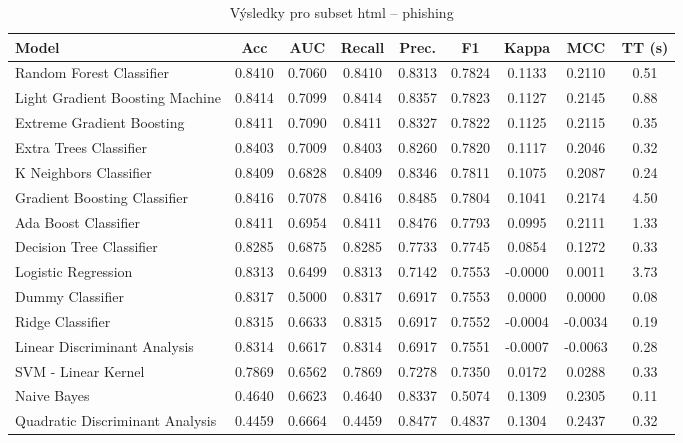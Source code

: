 \begin{table}[H]
  \centering
  \small
  \caption{Výsledky pro subset html – phishing}
  \begin{tabular}{|l|c|c|c|c|c|c|c|c|}
    \hline
    \textbf{Model} & \textbf{Acc} & \textbf{AUC} & \textbf{Recall} & \textbf{Prec.} & \textbf{F1} & \textbf{Kappa} & \textbf{MCC} & \textbf{TT (s)} \\
    \hline
    Random Forest Classifier & 0.8410 & 0.7060 & 0.8410 & 0.8313 & 0.7824 & 0.1133 & 0.2110 & 0.51 \\
    Light Gradient Boosting Machine & 0.8414 & 0.7099 & 0.8414 & 0.8357 & 0.7823 & 0.1127 & 0.2145 & 0.88 \\
    Extreme Gradient Boosting & 0.8411 & 0.7090 & 0.8411 & 0.8327 & 0.7822 & 0.1125 & 0.2115 & 0.35 \\
    Extra Trees Classifier & 0.8403 & 0.7009 & 0.8403 & 0.8260 & 0.7820 & 0.1117 & 0.2046 & 0.32 \\
    K Neighbors Classifier & 0.8409 & 0.6828 & 0.8409 & 0.8346 & 0.7811 & 0.1075 & 0.2087 & 0.24 \\
    Gradient Boosting Classifier & 0.8416 & 0.7078 & 0.8416 & 0.8485 & 0.7804 & 0.1041 & 0.2174 & 4.50 \\
    Ada Boost Classifier & 0.8411 & 0.6954 & 0.8411 & 0.8476 & 0.7793 & 0.0995 & 0.2111 & 1.33 \\
    Decision Tree Classifier & 0.8285 & 0.6875 & 0.8285 & 0.7733 & 0.7745 & 0.0854 & 0.1272 & 0.33 \\
    Logistic Regression & 0.8313 & 0.6499 & 0.8313 & 0.7142 & 0.7553 & -0.0000 & 0.0011 & 3.73 \\
    Dummy Classifier & 0.8317 & 0.5000 & 0.8317 & 0.6917 & 0.7553 & 0.0000 & 0.0000 & 0.08 \\
    Ridge Classifier & 0.8315 & 0.6633 & 0.8315 & 0.6917 & 0.7552 & -0.0004 & -0.0034 & 0.19 \\
    Linear Discriminant Analysis & 0.8314 & 0.6617 & 0.8314 & 0.6917 & 0.7551 & -0.0007 & -0.0063 & 0.28 \\
    SVM - Linear Kernel & 0.7869 & 0.6562 & 0.7869 & 0.7278 & 0.7350 & 0.0172 & 0.0288 & 0.33 \\
    Naive Bayes & 0.4640 & 0.6623 & 0.4640 & 0.8337 & 0.5074 & 0.1309 & 0.2305 & 0.11 \\
    Quadratic Discriminant Analysis & 0.4459 & 0.6664 & 0.4459 & 0.8477 & 0.4837 & 0.1304 & 0.2437 & 0.32 \\
    \hline
  \end{tabular}
\end{table}
\vspace{0.5cm}

